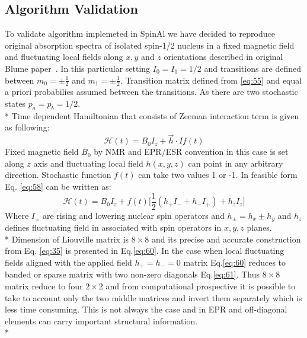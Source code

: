 \subsection{Algorithm Validation}\label{blumeinitialmodel}
To validate algorithm implemeted in SpinAl we have decided to reproduce original absorption spectra of isolated spin-1/2 nucleus in a fixed magnetic field and fluctuating local fields along $x,y$ and $z$ orientations described in original Blume paper~\cite{blume}. In this particular setting $I_0=I_1=1/2$ and transitions are defined between $m_{0}=\pm\frac{1}{2}$ and $m_{1}=\pm\frac{1}{2}$. Transition matrix defined from \ref{eq:55} and equal a priori probabilies assumed between the transitions. As there are two stochastic states $p_a=p_b=1/2$.\\*
Time dependent Hamiltonian that consists of Zeeman interaction term is given as following: 
\begin{equation}\label{eq:58}
\mathcal{H}(t)=B_0I_z+\vec{h}\cdot\hat{I}f(t)
\end{equation}  
Fixed magnetic field $B_0$ by NMR and EPR/ESR convention in this case is set along $z$ axis and fluctuating local field $h(x,y,z)$ can point in any arbitrary direction. Stochastic function $f(t)$ can take two values 1 or -1. In feasible form Eq. \ref{eq:58} can be written as: 
\begin{equation}\label{eq:blumeham}
\mathcal{H}(t)=B_0I_z+f(t)\big[\frac{1}{2}(h_+I_-+h_-I_+)+h_zI_z\big]
\end{equation}     
Where $I_{\pm}$ are rising and lowering nuclear spin operators and $h_{\pm}=h_x\pm h_y$ and $h_z$ defines fluctuating field in associated with spin operators in $x,y,z$ planes. \\*
Dimension of Liouville matrix is $8\times 8$ and its precise and accurate construction from Eq. \ref{eq:35} is presented in Eq.\ref{eq:60}. In the case when local fluctuating fields aligned with the applied field $h_+=h_-=0$ matrix Eq.\ref{eq:60} reduces to banded or sparse matrix with two non-zero diagonals Eq.\ref{eq:61}. Thus $8\times 8$ matrix reduce to four $2\times 2$ and from computational prospective it is possible to take to account only the two middle matrices and invert them separately which is less time consuming. This is not always the case and in EPR and off-diagonal elements can carry important structural information. \\*
